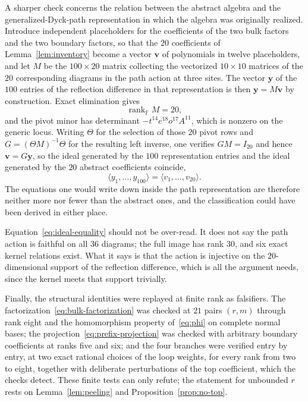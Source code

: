 \documentclass[
  aps,pre,
  reprint,
  superscriptaddress,
  amsmath,amssymb,
  floatfix
]{revtex4-2}
\theoremstyle{plain}
\theoremstyle{definition}
\theoremstyle{remark}
\newcommand{\Fld}{\mathbb{F}}
\DeclareMathOperator{\rank}{rank}
\begin{document}
A sharper check concerns the relation between the abstract algebra and the
generalized-Dyck-path representation in which the algebra was originally
realized. Introduce independent placeholders for the coefficients of the two
bulk factors and the two boundary factors, so that the $20$ coefficients of
Lemma~\ref{lem:inventory} become a vector $\bm{v}$ of polynomials in twelve
placeholders, and let $M$ be the $100\times20$ matrix collecting the vectorized
$10\times10$ matrices of the $20$ corresponding diagrams in the path action at
three sites. The vector $\bm{y}$ of the $100$ entries of the reflection
difference in that representation is then $\bm{y}=M\bm{v}$ by construction.
Exact elimination gives
\begin{equation}
  \rank_{\Fld}M=20,
  \label{eq:rank20}
\end{equation}
and the pivot minor has determinant $-t^{14}e^{18}o^{17}A^{11}$, which is
nonzero on the generic locus. Writing $\Theta$ for the selection of those $20$
pivot rows and $G=(\Theta M)^{-1}\Theta$ for the resulting left inverse, one
verifies $GM=I_{20}$ and hence $\bm{v}=G\bm{y}$, so the ideal generated by the
$100$ representation entries and the ideal generated by the $20$ abstract
coefficients coincide,
\begin{equation}
  \langle y_1,\dots,y_{100}\rangle
  =\langle v_1,\dots,v_{20}\rangle .
  \label{eq:ideal-equality}
\end{equation}
The equations one would write down inside the path representation are therefore
neither more nor fewer than the abstract ones, and the classification could
have been derived in either place.

Equation~\eqref{eq:ideal-equality} should not be over-read. It does not say the
path action is faithful on all $36$ diagrams; the full image has rank $30$, and
six exact kernel relations exist. What it says is that the action is injective
on the $20$-dimensional support of the reflection difference, which is all the
argument needs, since the kernel meets that support trivially.

Finally, the structural identities were replayed at finite rank as falsifiers.
The factorization~\eqref{eq:bulk-factorization} was checked at $21$ pairs
$(r,m)$ through rank eight and the homomorphism property
of~\eqref{eq:phi} on complete normal bases; the
projection~\eqref{eq:prefix-projection} was checked with arbitrary boundary
coefficients at ranks five and six; and the four branches were verified entry
by entry, at two exact rational choices of the loop weights, for every rank
from two to eight, together with deliberate perturbations of the top
coefficient, which the checks detect. These finite tests can only refute; the
statement for unbounded $r$ rests on
Lemma~\ref{lem:peeling} and Proposition~\ref{prop:no-top}.
\end{document}
